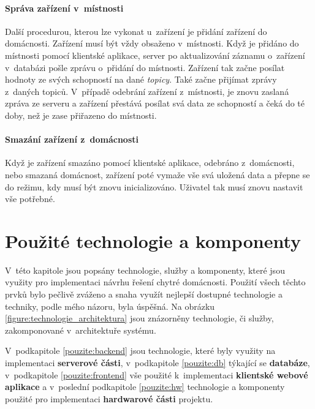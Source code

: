 \newpage
\subsubsection*{Správa zařízení v~místnosti}
Další procedurou, kterou lze vykonat u~zařízení je přidání zařízení do domácnosti.
Zařízení musí být vždy obsaženo v~místnosti.
Když je přidáno do místnosti pomocí klientské aplikace, server po aktualizování záznamu o~zařízení v~databázi pošle zprávu o~přidání do místnosti.
Zařízení tak začne posílat hodnoty ze svých schopností na dané \emph{topicy}. Také začne přijímat zprávy z~daných topiců.
V~případě odebrání zařízení z~místnosti, je znovu zaslaná zpráva ze serveru a zařízení přestává posílat svá data ze schopností a čeká do té doby, než je zase přiřazeno do místnosti.
\newline

\subsubsection*{Smazání zařízení z~domácnosti}
Když je zařízení smazáno pomocí klientské aplikace, odebráno z~domácnosti, nebo smazaná domácnost, zařízení poté vymaže vše svá uložená data a přepne se do režimu, kdy musí být znovu inicializováno.
Uživatel tak musí znovu nastavit vše potřebné.

\newpage
\chapter{Použité technologie a komponenty}
\label{pouzite}

V~této kapitole jsou popsány technologie, služby a komponenty, které jsou využity pro implementaci návrhu řešení chytré domácnosti.
Použití všech těchto prvků bylo pečlivě zváženo a snaha využít nejlepší dostupné technologie a techniky, podle mého názoru, byla úspěšná.
Na obrázku \ref{figure:technologie_architektura} jsou znázorněny technologie, či služby, zakomponované v~architektuře systému.

V~podkapitole \ref{pouzite:backend} jsou technologie, které byly využity na implementaci \textbf{serverové části}, v~podkapitole \ref{pouzite:db} týkající se \textbf{databáze},
v~podkapitole \ref{pouzite:frontend} vše použité k~implementaci \textbf{klientské webové aplikace} a v~poslední podkapitole \ref{pouzite:hw} technologie a komponenty použité pro implementaci \textbf{hardwarové části} projektu.

